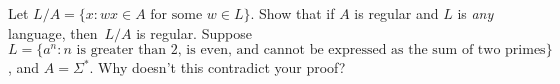 \documentclass[letterpaper, ps]{cs121}
\begin{document}



\subproblem Let $L/A = \{ x : \text{$wx \in A$ for some $w \in L$} \}$. Show that if $A$ is regular and $L$ is \emph{any} language, then~$L/A$ is regular.
\subproblem Suppose $L = \{a^n : n \text { is greater than 2, is even, and cannot be expressed as the sum of two primes}\}$, and $A = \Sigma^*$. Why doesn't this contradict your proof?


\end{document}
